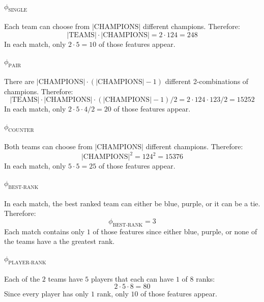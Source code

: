 \paragraph{$\phi_{\text{SINGLE}}$}
\begin{adjustwidth}{2cm}{}
    Each team can choose from $|\text{CHAMPIONS}|$ different champions. Therefore:
    \[|\text{TEAMS}| \cdot |\text{CHAMPIONS}| = 2 \cdot 124 = 248\] In each match, only $2 \cdot 5 = 10$ of those features appear.
\end{adjustwidth}

\paragraph{$\phi_{\text{PAIR}}$}
\begin{adjustwidth}{2cm}{}
    There are $|\text{CHAMPIONS}| \cdot (|\text{CHAMPIONS}|-1)$ different 2-combinations of champions. Therefore:
    \[|\text{TEAMS}| \cdot |\text{CHAMPIONS}| \cdot (|\text{CHAMPIONS}|-1) / 2 = 2 \cdot 124 \cdot 123 / 2 = 15252\] In each match, only $2 \cdot 5 \cdot 4 / 2 = 20$ of those features appear.
\end{adjustwidth}

\paragraph{$\phi_{\text{COUNTER}}$}
\begin{adjustwidth}{2cm}{}
Both teams can choose from $|\text{CHAMPIONS}|$ different champions. Therefore:
\[|\text{CHAMPIONS}|^2 = 124^2 = 15376\] 
In each match, only $5 \cdot 5 = 25$ of those features appear.
\end{adjustwidth}

\paragraph{$\phi_{\text{BEST-RANK}}$}
\begin{adjustwidth}{2cm}{}
In each match, the best ranked team can either be blue, purple, or it can be a tie. Therefore:
\[\phi_{\text{BEST-RANK}} = 3\] 
Each match contains only $1$ of those features since either blue, purple, or none of the teams have a the greatest rank.
\end{adjustwidth}

\paragraph{$\phi_{\text{PLAYER-RANK}}$}
\begin{adjustwidth}{2cm}{}
Each of the $2$ teams have $5$ players that each can have $1$ of $8$ ranks:
\[ 2 \cdot 5 \cdot 8 = 80\] 
Since every player has only $1$ rank, only $10$ of those features appear.
\end{adjustwidth}

